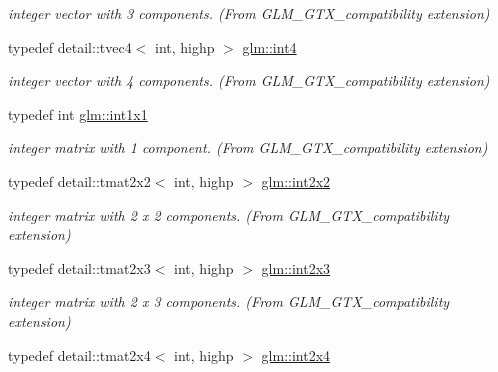 \begin{CompactItemize}
\begin{CompactList}\small\item\em integer vector with 3 components. (From GLM\_\-GTX\_\-compatibility extension) \item\end{CompactList}\item 
\hypertarget{group__gtx__compatibility_g9f621a690aa1c2918a9a8a684376b562}{
typedef detail::tvec4$<$ int, highp $>$ \hyperlink{group__gtx__compatibility_g9f621a690aa1c2918a9a8a684376b562}{glm::int4}}
\label{group__gtx__compatibility_g9f621a690aa1c2918a9a8a684376b562}

\begin{CompactList}\small\item\em integer vector with 4 components. (From GLM\_\-GTX\_\-compatibility extension) \item\end{CompactList}\item 
\hypertarget{group__gtx__compatibility_g09016a637a3cd093c22e6188080ac750}{
typedef int \hyperlink{group__gtx__compatibility_g09016a637a3cd093c22e6188080ac750}{glm::int1x1}}
\label{group__gtx__compatibility_g09016a637a3cd093c22e6188080ac750}

\begin{CompactList}\small\item\em integer matrix with 1 component. (From GLM\_\-GTX\_\-compatibility extension) \item\end{CompactList}\item 
\hypertarget{group__gtx__compatibility_g7762d2b809aab75003e7e7873ca74a2f}{
typedef detail::tmat2x2$<$ int, highp $>$ \hyperlink{group__gtx__compatibility_g7762d2b809aab75003e7e7873ca74a2f}{glm::int2x2}}
\label{group__gtx__compatibility_g7762d2b809aab75003e7e7873ca74a2f}

\begin{CompactList}\small\item\em integer matrix with 2 x 2 components. (From GLM\_\-GTX\_\-compatibility extension) \item\end{CompactList}\item 
\hypertarget{group__gtx__compatibility_g42c3d6e4924de559104b9ca2b127c9ac}{
typedef detail::tmat2x3$<$ int, highp $>$ \hyperlink{group__gtx__compatibility_g42c3d6e4924de559104b9ca2b127c9ac}{glm::int2x3}}
\label{group__gtx__compatibility_g42c3d6e4924de559104b9ca2b127c9ac}

\begin{CompactList}\small\item\em integer matrix with 2 x 3 components. (From GLM\_\-GTX\_\-compatibility extension) \item\end{CompactList}\item 
\hypertarget{group__gtx__compatibility_g145a388c0d988490d6ce901a664faf50}{
typedef detail::tmat2x4$<$ int, highp $>$ \hyperlink{group__gtx__compatibility_g145a388c0d988490d6ce901a664faf50}{glm::int2x4}}
\label{group__gtx__compatibility_g145a388c0d988490d6ce901a664faf50}


\end{CompactItemize}
